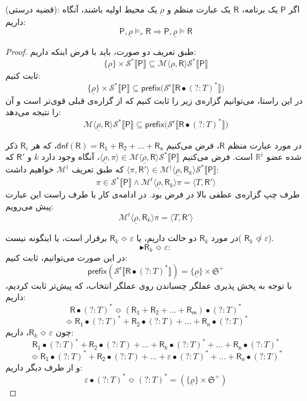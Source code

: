 \begin{thm}
	(قضیه درستی): اگر $\mathsf{P}$ یک برنامه، $\mathsf{R}$ یک عبارت منظم و $\underline{\rho}$ یک محیط اولیه باشند، آنگاه داریم:
	$$\mathsf{P},\underline{\rho} \models_r \mathsf{R} \Rightarrow
	\mathsf{P},\underline{\rho} \models \mathsf{R}$$
\end{thm}
\begin{proof}
	طبق تعریف دو صورت، باید با فرض اینکه داریم:
	$$\{\underline{\rho}\}\times\mathcal{S}^* \llbracket \mathsf{P} \rrbracket \subseteq 
	\mathcal{M}\langle \underline{\rho},\mathsf{R} \rangle \mathcal{S}^* \llbracket \mathsf{P} \rrbracket$$
	ثابت کنیم:
	$$\{\underline{\rho}\}\times\mathcal{S}^* \llbracket \mathsf{P} \rrbracket \subseteq 
	\mathsf{prefix(\mathcal{S}^r \llbracket R \bullet (?:\mathit{T})^*} \rrbracket)$$
	در این راستا، می‌توانیم گزاره‌ی زیر را ثابت کنیم که از گزاره‌ی قبلی قوی‌تر است و آن را نتیجه می‌دهد:
	$$\mathcal{M}\langle \underline{\rho},\mathsf{R} \rangle \mathcal{S}^* \llbracket \mathsf{P} \rrbracket \subseteq \mathsf{prefix(\mathcal{S}^r \llbracket R \bullet (?:\mathit{T})^*} \rrbracket)$$
	
	در مورد عبارت منظم $\mathsf{R}$، فرض می‌کنیم
	$\mathsf{dnf(R)=R_1+R_2+...+R_n}$،
	که هر $\mathsf{R}_i$ ذکر شده عضو $\mathbb{R}^\nmid$ است. 
	فرض می‌کنیم
	$\langle \underline{\rho}, \pi \rangle \in \mathcal{M}\langle \underline{\rho},\mathsf{R} \rangle \mathcal{S}^* \llbracket \mathsf{P} \rrbracket$،
	آنگاه وجود دارد $k$ و $\mathsf{R'}$ که \break
	$\langle \pi , \mathsf{R'} \rangle  \in \mathcal{M}^\nmid\langle \underline{\rho},\mathsf{R}_k \rangle \mathcal{S}^* \llbracket \mathsf{P} \rrbracket$
	که طبق تعریف $\mathcal{M}^\nmid$ خواهیم داشت:
	$$\pi \in \mathcal{S}^* \llbracket \mathsf{P} \rrbracket \land \mathcal{M}^t \langle \underline{\rho},\mathsf{R}_k \rangle \pi = \langle \mathit{T},\mathsf{R'} \rangle$$
	طرف چپ گزاره‌ی عطفی بالا در فرض بود. در ادامه‌ی کار با طرف راست این عبارت پیش می‌رویم:
	$$\mathcal{M}^t \langle \underline{\rho},\mathsf{R}_k\rangle \pi = \langle \mathit{T},\mathsf{R'} \rangle$$

در مورد $\mathsf{R}_k$ دو حالت داریم، یا 
$\mathsf{R}_k \Bumpeq \varepsilon$
برقرار است، یا اینگونه نیست( 
$\mathsf{R}_k \not\Bumpeq \varepsilon$).
$$\blacktriangleright\mathsf{R}_k \Bumpeq \varepsilon:$$
در این صورت می‌توانیم، ثابت کنیم: 
$$\mathsf{prefix(\mathcal{S}^r \llbracket \mathsf{R} \bullet (?:\mathit{T})^* \rrbracket)}=
	\{\underline{\rho}\} \times \mathfrak{S}^+$$
با توجه به پخش پذیری عملگر چسباندن روی عملگر انتخاب، که پیش‌تر ثابت کردیم، داریم:
$$\mathsf{R}\bullet(?:\mathit{T})^* \Bumpeq \mathsf{(R_1 + R_2 + ... +R_m)}\bullet(?:\mathit{T})^*$$
$$\Bumpeq \mathsf{R_1}\bullet (?:\mathit{T})^* + \mathsf{R_2} \bullet (?:\mathit{T})+...+ \mathsf{R_n} \bullet (?:\mathit{T})^*$$
چون $\mathsf{R}_k \Bumpeq \varepsilon$، داریم:
$$\mathsf{R_1}\bullet (?:\mathit{T})^* + \mathsf{R_2} \bullet (?:\mathit{T})+...+ \mathsf{R}_k \bullet (?:\mathit{T})^* +...+ \mathsf{R_n} \bullet (?:\mathit{T})^*$$
$$\Bumpeq \mathsf{R_1}\bullet (?:\mathit{T})^* + \mathsf{R_2} \bullet (?:\mathit{T})+...+ \varepsilon \bullet (?:\mathit{T})^* +...+ \mathsf{R_n} \bullet (?:\mathit{T})^*$$
و از طرف دیگر داریم:
$$\varepsilon \bullet (?:\mathit{T})^* \Bumpeq (?:\mathit{T})^* = (\{\underline{\rho}\} \times \mathfrak{S}^+)$$  


\end{proof}
